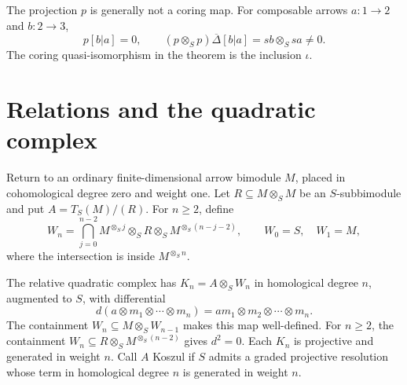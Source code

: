 The projection $p$ is generally not a coring map.
For composable arrows $a:1\to2$ and $b:2\to3$,
\[
 p[b|a]=0,\qquad
 (p\otimes_Sp)\overline\Delta[b|a]=sb\otimes_Ssa\ne0.
\]
The coring quasi-isomorphism in the theorem is the inclusion $\iota$.

\section{Relations and the quadratic complex}

Return to an ordinary finite-dimensional arrow bimodule $M$, placed in cohomological degree zero and weight one.
Let $R\subseteq M\otimes_S M$ be an $S$-subbimodule and put $A=T_S(M)/(R)$.
For $n\ge2$, define
\[
 W_n=\bigcap_{j=0}^{n-2}
 M^{\otimes_S j}\otimes_S R\otimes_S M^{\otimes_S(n-j-2)},
 \qquad W_0=S,\quad W_1=M,
\]
where the intersection is inside $M^{\otimes_S n}$.

The relative quadratic complex has $K_n=A\otimes_S W_n$ in homological degree $n$, augmented to $S$, with differential
\[
 d(a\otimes m_1\otimes\cdots\otimes m_n)
 =am_1\otimes m_2\otimes\cdots\otimes m_n.
\]
The containment $W_n\subseteq M\otimes_S W_{n-1}$ makes this map well-defined.
For $n\ge2$, the containment $W_n\subseteq R\otimes_S M^{\otimes_S(n-2)}$ gives $d^2=0$.
Each $K_n$ is projective and generated in weight $n$.
Call $A$ Koszul if $S$ admits a graded projective resolution whose term in homological degree $n$ is generated in weight $n$.

